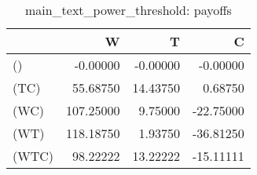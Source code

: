 \begin{table}
\centering
\caption{main_text_power_threshold: payoffs}
\begin{tabular}{lrrr}
\toprule
{} &         W &        T &         C \\
\midrule
()    &  -0.00000 & -0.00000 &  -0.00000 \\
(TC)  &  55.68750 & 14.43750 &   0.68750 \\
(WC)  & 107.25000 &  9.75000 & -22.75000 \\
(WT)  & 118.18750 &  1.93750 & -36.81250 \\
(WTC) &  98.22222 & 13.22222 & -15.11111 \\
\bottomrule
\end{tabular}
\end{table}
